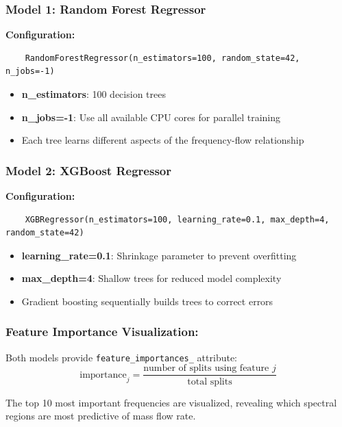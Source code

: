 \subsubsection{Model 1: Random Forest Regressor}

\textbf{Configuration:}
\begin{verbatim}
    RandomForestRegressor(n_estimators=100, random_state=42, n_jobs=-1)
\end{verbatim}

\begin{itemize}
    \item \textbf{n\_estimators}: 100 decision trees
    \item \textbf{n\_jobs=-1}: Use all available CPU cores for parallel training
    \item Each tree learns different aspects of the frequency-flow relationship
\end{itemize}

\subsubsection{Model 2: XGBoost Regressor}

\textbf{Configuration:}
\begin{verbatim}
    XGBRegressor(n_estimators=100, learning_rate=0.1, max_depth=4, random_state=42)
\end{verbatim}

\begin{itemize}
    \item \textbf{learning\_rate=0.1}: Shrinkage parameter to prevent overfitting
    \item \textbf{max\_depth=4}: Shallow trees for reduced model complexity
    \item Gradient boosting sequentially builds trees to correct errors
\end{itemize}

\subsubsection{Feature Importance Visualization:}
Both models provide \verb|feature_importances_| attribute:
\begin{equation}\label{feature_importance}
    \text{importance}_j = \frac{\text{number of splits using feature } j}{\text{total splits}}
\end{equation}

The top 10 most important frequencies are visualized, revealing which spectral regions are most 
predictive of mass flow rate.


